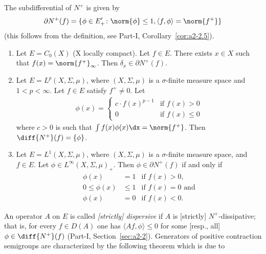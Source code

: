 The subdifferential of\/ $N^{+}$ is given by
\begin{equation}\label{eq:c2-1.2}
	\partial N^{+}(f) = \{\phi \in E'_{+} \colon \norm{\phi} \leq 1, \langle f,\phi \rangle = \norm{f^{+}}\}
\end{equation}
(this follows from the definition, see Part-I, Corollary~\ref{cor:a2-2.5}). 
\begin{examples}\label{ex:c2-1.1}
%
\begin{enumerate}[\upshape (i), wide, labelindent=.25em]  %
\item \label{ex:c2-1.1-1}
Let $E = C_{0}(X)$ (X locally compact). 
Let $f \in E$.
There exists $x \in X$ such that $f(x) = \norm{f^{+}}_{\infty}$. 
Then $\delta_{x} \in \partial N^{+}(f)$.
\item \label{ex:c2-1.1-2}
Let $E = L^{p}(X,\Sigma,\mu)$, where $(X,\Sigma,\mu)$ is a $\sigma$-finite measure space and $1 < p < \infty$. Let $f \in E$ satisfy $f^{+} \neq 0$. Let
\begin{align*}
\phi(x) = 
    \begin{cases}
        c \cdot f(x)^{p-1} & \text{if } f(x) > 0 \\
        0 & \text{if } f(x) \leq 0
    \end{cases}
\end{align*}
where $c > 0$ is such that $\int f(x) \phi(x) \dx = \norm{f^{+}}$.
Then $\diff{N^{+}}(f) = \{\phi\}$.
\item \label{ex:c2-1.1-3}
Let $E = L^{1}(X,\Sigma,\mu)$, where $(X,\Sigma,\mu)$ is a $\sigma$-finite measure space, and $f \in E$. Let $\phi \in L^{\infty}(X,\Sigma,\mu)_{+}$. Then $\phi \in \partial N^{+}(f)$ if and only if
\begin{align*}
\phi(x) &= 1 & \text{if } f(x) > 0, \\
0 \leq \phi(x) &\leq 1 & \text{if } f(x) = 0 \text{ and} \\
\phi(x) &= 0 & \text{if } f(x) < 0.
\end{align*}
\end{enumerate}
\end{examples}
An operator $A$ on $E$ is called \emph{[strictly] dispersive} if\/ $A$ is [strictly] $N^{+}$-dissipative; that is, for every $f \in D(A)$ one has $\langle Af,\phi \rangle \leq 0$ for some [resp., all] $\phi \in \diff{N^{+}}(f)$ (\cf Part-I, Section~\ref{sec:a2-2}). 
Generators of positive contraction semigroups are characterized by the following theorem which is due to 
